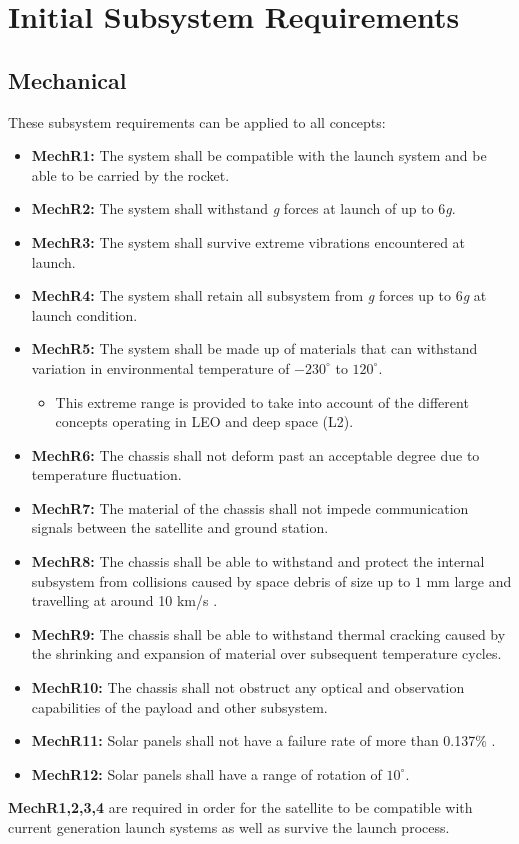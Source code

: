 \section{Initial Subsystem Requirements}
\subsection{Mechanical}
These subsystem requirements can be applied to all concepts:
\begin{itemize}
    \item \textbf{MechR1:} The system shall be compatible with the launch system and be able to be carried by the rocket.
    \item \textbf{MechR2:} The system shall withstand \textit{g} forces at launch of up to 6\textit{g}.
    \item \textbf{MechR3:} The system shall survive extreme vibrations encountered at launch.
    \item \textbf{MechR4:} The system shall retain all subsystem from \textit{g} forces up to 6\textit{g} at launch condition.
    \item \textbf{MechR5:} The system shall be made up of materials that can withstand variation in environmental temperature of $-230^{\circ}$ to $120^{\circ}$. 
    \begin{itemize}
        \item This extreme range is provided to take into account of the different concepts operating in LEO and deep space (L2).
    \end{itemize}
    \item \textbf{MechR6:} The chassis shall not deform past an acceptable degree due to temperature fluctuation.
    \item \textbf{MechR7:} The material of the chassis shall not impede communication signals between the satellite and ground station.
    \item \textbf{MechR8:} The chassis shall be able to withstand and protect the internal subsystem from collisions caused by space debris of size up to $1$ mm large and travelling at around 10 km/s \cite{ESA2020HubbleDebris}.
    \item \textbf{MechR9:} The chassis shall be able to withstand thermal cracking caused by the shrinking and expansion of material over subsequent temperature cycles.
    \item \textbf{MechR10:} The chassis shall not obstruct any optical and observation capabilities of the payload and other subsystem.
    \item \textbf{MechR11:} Solar panels shall not have a failure rate of more than 0.137\% \cite{stewart2021final}.
    \item \textbf{MechR12:} Solar panels shall have a range of rotation of $10^{\circ}$. 
\end{itemize}
\textbf{MechR1,2,3,4} are required in order for the satellite to be compatible with current generation launch systems as well as survive the launch process.

